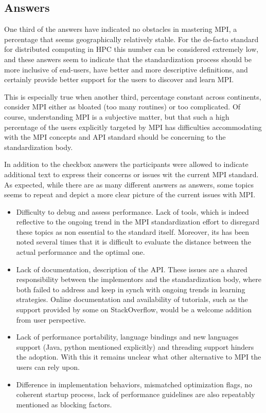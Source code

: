 
\subsection{Answers}



One third of the answers have indicated no obstacles in mastering MPI, a
percentage that seems geographically relatively stable. For the de-facto
standard for distributed computing in HPC this number can be considered
extremely low, and these answers seem to indicate that the standardization
process should be more inclusive of end-users, have better and more descriptive
definitions, and certainly provide better support for the users to discover and
learn MPI.

This is especially true when another third, percentage constant across
continents, consider MPI either as bloated (too many routines) or too
complicated. Of course, understanding MPI is a subjective matter, but that such
a high percentage of the users explicitly targeted by MPI has difficulties
accommodating with the MPI concepts and API standard should be concerning to the
standardization body.

In addition to the checkbox answers the participants were allowed to indicate
additional text to express their concerns or issues wit the current MPI
standard. As expected, while there are as many different answers as answers,
some topics seems to repeat and depict a more clear picture of the current
issues with MPI.

\begin{itemize}
\item Difficulty to debug and assess performance. Lack of tools, which is indeed
  reflective to the ongoing trend in the MPI standardization effort to disregard
  these topics as non essential to the standard itself. Moreover, its has been
  noted several times that it is difficult to evaluate the distance between the
  actual performance and the optimal one. 
\item Lack of documentation, description of the API. These issues are a shared
  responsibility between the implementors and the standardization body, where
  both failed to address and keep in synch with ongoing trends in learning
  strategies. Online documentation and availability of tutorials, such as the
  support provided by some on StackOverflow, would be a welcome addition from
  user perspective.
\item Lack of performance portability, language bindings and new languages
  support (Java, python mentioned explicitly) and threading support hinders the
  adoption. With this it remains unclear what other alternative to MPI the users
  can rely upon.
\item Difference in implementation behaviors, mismatched optimization flags, no
  coherent startup process, lack of performance guidelines are also repeatably
  mentioned as blocking factors.
\end{itemize}


